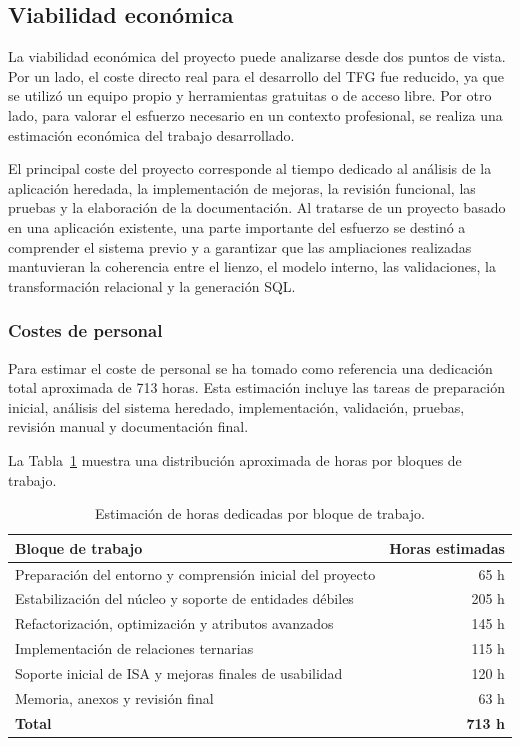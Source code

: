 \subsection{Viabilidad económica}

La viabilidad económica del proyecto puede analizarse desde dos puntos de vista. Por un lado, el coste directo real para el desarrollo del TFG fue reducido, ya que se utilizó un equipo propio y herramientas gratuitas o de acceso libre. Por otro lado, para valorar el esfuerzo necesario en un contexto profesional, se realiza una estimación económica del trabajo desarrollado.

El principal coste del proyecto corresponde al tiempo dedicado al análisis de la aplicación heredada, la implementación de mejoras, la revisión funcional, las pruebas y la elaboración de la documentación. Al tratarse de un proyecto basado en una aplicación existente, una parte importante del esfuerzo se destinó a comprender el sistema previo y a garantizar que las ampliaciones realizadas mantuvieran la coherencia entre el lienzo, el modelo interno, las validaciones, la transformación relacional y la generación SQL.

\subsubsection{Costes de personal}

Para estimar el coste de personal se ha tomado como referencia una dedicación total aproximada de 713 horas. Esta estimación incluye las tareas de preparación inicial, análisis del sistema heredado, implementación, validación, pruebas, revisión manual y documentación final.

La Tabla~\ref{tab:costes_personal_horas} muestra una distribución aproximada de horas por bloques de trabajo.

\begin{table}[H]
\centering
\small
\renewcommand{\arraystretch}{1.2}
\begin{tabular}{p{} r}
\toprule
\textbf{Bloque de trabajo} & \textbf{Horas estimadas} \tabularnewline
\midrule
Preparación del entorno y comprensión inicial del proyecto & 65 h \tabularnewline
Estabilización del núcleo y soporte de entidades débiles & 205 h \tabularnewline
Refactorización, optimización y atributos avanzados & 145 h \tabularnewline
Implementación de relaciones ternarias & 115 h \tabularnewline
Soporte inicial de ISA y mejoras finales de usabilidad & 120 h \tabularnewline
Memoria, anexos y revisión final & 63 h \tabularnewline
\midrule
\textbf{Total} & \textbf{713 h} \tabularnewline
\bottomrule
\end{tabular}
\caption{Estimación de horas dedicadas por bloque de trabajo.}
\label{tab:costes_personal_horas}
\end{table}

